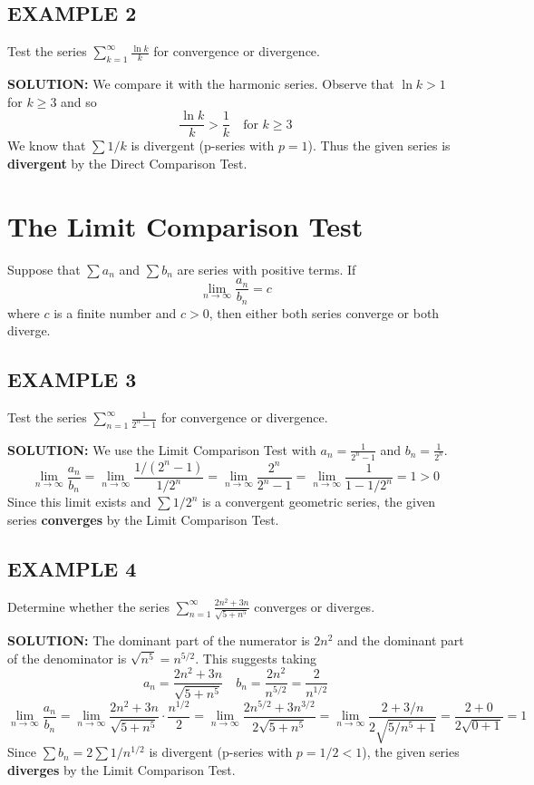 \documentclass{article}
\theoremstyle{mystyle}
\begin{document}
\subsection*{EXAMPLE 2}
Test the series \( \sum_{k=1}^{\infty} \frac{\ln k}{k} \) for convergence or divergence.

\textbf{SOLUTION:}
We compare it with the harmonic series. Observe that $\ln k > 1$ for $k \ge 3$ and so
\[ \frac{\ln k}{k} > \frac{1}{k} \quad \text{for } k \ge 3 \]
We know that $\sum 1/k$ is divergent (p-series with $p=1$). Thus the given series is \textbf{divergent} by the Direct Comparison Test.

\section*{The Limit Comparison Test}
\begin{tcolorbox}[
    colback=white,
    colframe=orange!80!white,
    title=The Limit Comparison Test,
    boxrule=0.5mm,
    arc=3mm
    ]
    Suppose that \( \sum a_n \) and \( \sum b_n \) are series with positive terms. If
    \[ \lim_{n \to \infty} \frac{a_n}{b_n} = c \]
    where \( c \) is a finite number and \( c > 0 \), then either both series converge or both diverge.
\end{tcolorbox}

\subsection*{EXAMPLE 3}
Test the series \( \sum_{n=1}^{\infty} \frac{1}{2^n - 1} \) for convergence or divergence.

\textbf{SOLUTION:}
We use the Limit Comparison Test with $a_n = \frac{1}{2^n - 1}$ and $b_n = \frac{1}{2^n}$.
\[ \lim_{n \to \infty} \frac{a_n}{b_n} = \lim_{n \to \infty} \frac{1/(2^n - 1)}{1/2^n} = \lim_{n \to \infty} \frac{2^n}{2^n - 1} = \lim_{n \to \infty} \frac{1}{1 - 1/2^n} = 1 > 0 \]
Since this limit exists and $\sum 1/2^n$ is a convergent geometric series, the given series \textbf{converges} by the Limit Comparison Test.

\subsection*{EXAMPLE 4}
Determine whether the series \( \sum_{n=1}^{\infty} \frac{2n^2 + 3n}{\sqrt{5 + n^5}} \) converges or diverges.

\textbf{SOLUTION:}
The dominant part of the numerator is $2n^2$ and the dominant part of the denominator is $\sqrt{n^5} = n^{5/2}$. This suggests taking
\[ a_n = \frac{2n^2 + 3n}{\sqrt{5 + n^5}} \quad b_n = \frac{2n^2}{n^{5/2}} = \frac{2}{n^{1/2}} \]
\[ \lim_{n \to \infty} \frac{a_n}{b_n} = \lim_{n \to \infty} \frac{2n^2 + 3n}{\sqrt{5 + n^5}} \cdot \frac{n^{1/2}}{2} = \lim_{n \to \infty} \frac{2n^{5/2} + 3n^{3/2}}{2\sqrt{5 + n^5}} = \lim_{n \to \infty} \frac{2 + 3/n}{2\sqrt{5/n^5 + 1}} = \frac{2+0}{2\sqrt{0+1}} = 1 \]
Since $\sum b_n = 2\sum 1/n^{1/2}$ is divergent (p-series with $p = 1/2 < 1$), the given series \textbf{diverges} by the Limit Comparison Test.
\end{document}
